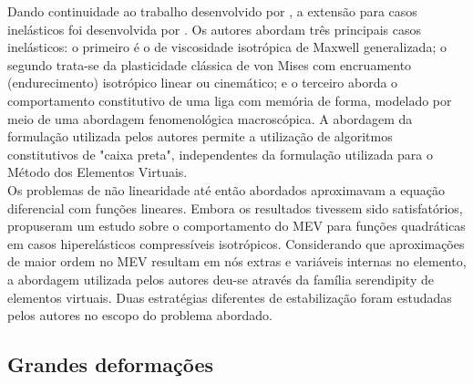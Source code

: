 \indent Dando continuidade ao trabalho desenvolvido por \citet{arbitraryorder2dvirtualelementspolygonalmeshespartelasticproblem2017a}, a extensão para casos inelásticos foi desenvolvida por \citet{arbitraryorder2dvirtualelementspolygonalmeshespartiiinelasticproblem2017a}. Os autores abordam três principais casos inelásticos: o primeiro é o de viscosidade isotrópica de Maxwell generalizada; o segundo trata-se da plasticidade clássica de von Mises com encruamento (endurecimento) isotrópico linear ou cinemático; e o terceiro aborda o comportamento constitutivo de uma liga com memória de forma, modelado por meio de uma abordagem fenomenológica macroscópica. A abordagem da formulação utilizada pelos autores permite a utilização de algoritmos constitutivos de "caixa preta", independentes da formulação utilizada para o Método dos Elementos Virtuais. \\
\indent Os problemas de não linearidade até então abordados aproximavam a equação diferencial com funções lineares. Embora os resultados tivessem sido satisfatórios, \citet{serendipityvirtualelementformulationnonlinearelasticity2019} propuseram um estudo sobre o comportamento do MEV para funções quadráticas em casos hiperelásticos compressíveis isotrópicos. Considerando que aproximações de maior ordem no MEV resultam em nós extras e variáveis internas no elemento, a abordagem utilizada pelos autores deu-se através da família serendipity de elementos virtuais. Duas estratégias diferentes de estabilização foram estudadas pelos autores no escopo do problema abordado. \\


\subsection{Grandes deformações}

